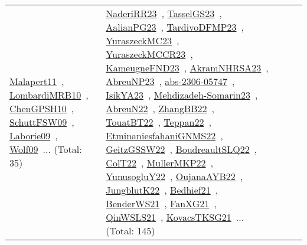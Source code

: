 {\begin{longtable}{lp{3cm}>{\raggedright\arraybackslash}p{6cm}>{\raggedright\arraybackslash}p{6cm}>{\raggedright\arraybackslash}p{8cm}}
\href{works/Malapert11.pdf}{Malapert11}~\cite{Malapert11}, \href{works/LombardiMRB10.pdf}{LombardiMRB10}~\cite{LombardiMRB10}, \href{works/ChenGPSH10.pdf}{ChenGPSH10}~\cite{ChenGPSH10}, \href{works/SchuttFSW09.pdf}{SchuttFSW09}~\cite{SchuttFSW09}, \href{works/Laborie09.pdf}{Laborie09}~\cite{Laborie09}, \href{works/Wolf09.pdf}{Wolf09}~\cite{Wolf09}... (Total: 35) & \href{works/NaderiRR23.pdf}{NaderiRR23}~\cite{NaderiRR23}, \href{works/TasselGS23.pdf}{TasselGS23}~\cite{TasselGS23}, \href{works/AalianPG23.pdf}{AalianPG23}~\cite{AalianPG23}, \href{works/TardivoDFMP23.pdf}{TardivoDFMP23}~\cite{TardivoDFMP23}, \href{works/YuraszeckMC23.pdf}{YuraszeckMC23}~\cite{YuraszeckMC23}, \href{works/YuraszeckMCCR23.pdf}{YuraszeckMCCR23}~\cite{YuraszeckMCCR23}, \href{works/KameugneFND23.pdf}{KameugneFND23}~\cite{KameugneFND23}, \href{works/AkramNHRSA23.pdf}{AkramNHRSA23}~\cite{AkramNHRSA23}, \href{works/AbreuNP23.pdf}{AbreuNP23}~\cite{AbreuNP23}, \href{works/abs-2306-05747.pdf}{abs-2306-05747}~\cite{abs-2306-05747}, \href{works/IsikYA23.pdf}{IsikYA23}~\cite{IsikYA23}, \href{works/Mehdizadeh-Somarin23.pdf}{Mehdizadeh-Somarin23}~\cite{Mehdizadeh-Somarin23}, \href{works/AbreuN22.pdf}{AbreuN22}~\cite{AbreuN22}, \href{works/ZhangBB22.pdf}{ZhangBB22}~\cite{ZhangBB22}, \href{works/TouatBT22.pdf}{TouatBT22}~\cite{TouatBT22}, \href{works/Teppan22.pdf}{Teppan22}~\cite{Teppan22}, \href{works/EtminaniesfahaniGNMS22.pdf}{EtminaniesfahaniGNMS22}~\cite{EtminaniesfahaniGNMS22}, \href{works/GeitzGSSW22.pdf}{GeitzGSSW22}~\cite{GeitzGSSW22}, \href{works/BoudreaultSLQ22.pdf}{BoudreaultSLQ22}~\cite{BoudreaultSLQ22}, \href{works/ColT22.pdf}{ColT22}~\cite{ColT22}, \href{works/MullerMKP22.pdf}{MullerMKP22}~\cite{MullerMKP22}, \href{works/YunusogluY22.pdf}{YunusogluY22}~\cite{YunusogluY22}, \href{works/OujanaAYB22.pdf}{OujanaAYB22}~\cite{OujanaAYB22}, \href{works/JungblutK22.pdf}{JungblutK22}~\cite{JungblutK22}, \href{works/Bedhief21.pdf}{Bedhief21}~\cite{Bedhief21}, \href{works/BenderWS21.pdf}{BenderWS21}~\cite{BenderWS21}, \href{works/FanXG21.pdf}{FanXG21}~\cite{FanXG21}, \href{works/QinWSLS21.pdf}{QinWSLS21}~\cite{QinWSLS21}, \href{works/KovacsTKSG21.pdf}{KovacsTKSG21}~\cite{KovacsTKSG21}... (Total: 145)\\

\end{longtable}}
